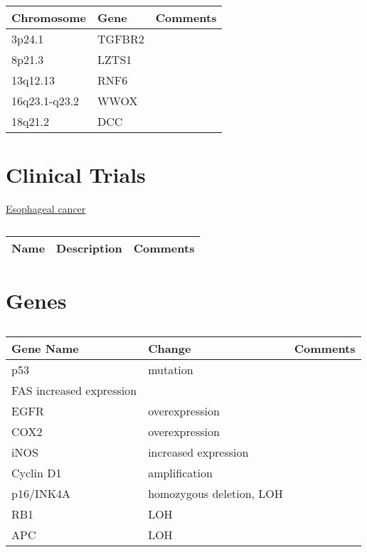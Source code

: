 \begin{table}[H]\centering
  \caption {\cite{key450}}
	\begin{tabular}{p{1cm}p{4cm}p{3cm}}
		Chromosome & Gene & Comments\\
		\hline
3p24.1 & TGFBR2 & \\	
8p21.3 &  LZTS1 & \\
13q12.13 & RNF6 & \\	
16q23.1-q23.2 & WWOX & \\ 	
18q21.2 & DCC & \\
		\hline
	\end{tabular}
\end{table}


\section{Clinical Trials}

\href{https://clinicaltrials.gov/ct2/results?cond=Esophageal+cancer&term=&cntry=&state=&city=&dist=}{Esophageal cancer}

\begin{table}[H]\centering
  \caption {\cite{key460}}
	\begin{tabular}{p{1cm}p{4cm}p{3cm}}
		Name & Description & Comments\\
		\hline
		\hline
	\end{tabular}
\end{table}

\section{Genes}

\begin{table}[H]\centering
  \caption {\cite{key400}}
	\begin{tabular}{p{1cm}p{4cm}p{3cm}}
		Gene Name & Change & Comments\\
		\hline
    p53  & mutation & \\
    FAS increased expression & \\
    EGFR & overexpression & \\
    COX2 & overexpression &  \\
    iNOS & increased expression & \\
    Cyclin D1 & amplification & \\
    p16/INK4A & homozygous deletion, LOH & \\
    RB1  & LOH & \\
    APC  & LOH & \\
		\hline
	\end{tabular}
\end{table}

